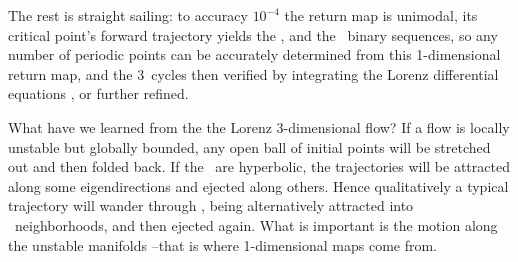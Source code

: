 The rest is straight sailing: to accuracy $10^{-4}$ the return
map is unimodal, its critical point's forward trajectory
yields the \ks, and the \admissible\ binary
sequences, so any number of periodic points  can be accurately
determined from this 1-dimensional return map, and the 3\dmn\
cycles then verified by integrating the Lorenz differential
equations , or further refined.

What have we learned from the the Lorenz 3-dimensional
flow? If a flow is locally unstable but globally bounded, any
open ball of initial points will be stretched out and then
folded back. If the \eqva\ are hyperbolic, the trajectories
will be attracted along some eigendirections and ejected along
others. Hence qualitatively a typical trajectory will wander through
\statesp, being alternatively attracted into \eqva\
neighborhoods, and then ejected again. What is important is the
motion along the unstable manifolds --that is where
1-dimensional maps come from.
